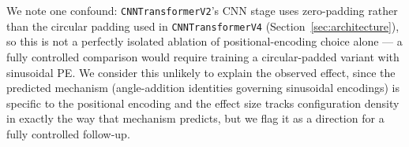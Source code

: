 We note one confound: \texttt{CNNTransformerV2}'s CNN stage uses
zero-padding rather than the circular padding used in
\texttt{CNNTransformerV4} (Section~\ref{sec:architecture}), so this is not
a perfectly isolated ablation of positional-encoding choice alone --- a
fully controlled comparison would require training a circular-padded
variant with sinusoidal PE. We consider this unlikely to explain the
observed effect, since the predicted mechanism (angle-addition identities
governing sinusoidal encodings) is specific to the positional encoding and
the effect size tracks configuration density in exactly the way that
mechanism predicts, but we flag it as a direction for a fully controlled
follow-up.
